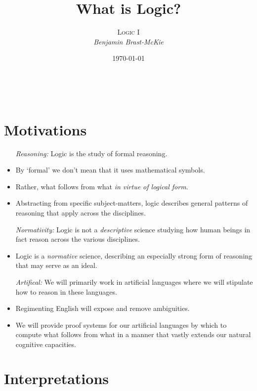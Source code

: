 \documentclass[a4paper, 11pt]{article} %
\title{\textbf{What is Logic?}} %
\author{\textsc{Logic I}\\ \em Benjamin Brast-McKie} %
\date{\today} %
\makeatletter
\renewcommand{\maketitle}{ %
\begin{flushright} %
{\LARGE\@title} %

\vspace{10pt} %

{\@author} %
\\\@date %

\vspace{-10pt} %
\end{flushright}
}
\makeatother
\begin{document}
\maketitle %

\thispagestyle{empty}


\section*{Motivations}

\begin{itemize}[leftmargin=1in,labelsep=.15in]
  \item[\it Reasoning:] Logic is the study of formal reasoning.
    \item By `formal' we don't mean that it uses mathematical symbols.
    \item Rather, what follows from what \textit{in virtue of logical form}.
    \item Abstracting from specific subject-matters, logic describes general patterns of reasoning that apply across the disciplines. %
  \item[\it Normativity:] Logic is not a \textit{descriptive} science studying how human beings in fact reason across the various disciplines.
    \item Logic is a \textit{normative} science, describing an especially strong form of reasoning that may serve as an ideal.
  \item[\it Artifical:] We will primarily work in artificial languages where we will stipulate how to reason in these languages.
    \item Regimenting English will expose and remove ambiguities.
    \item We will provide proof systems for our artificial languages by which to compute what follows from what in a manner that vastly extends our natural cognitive capacities.
\end{itemize}



\section*{Interpretations}
\end{document}
